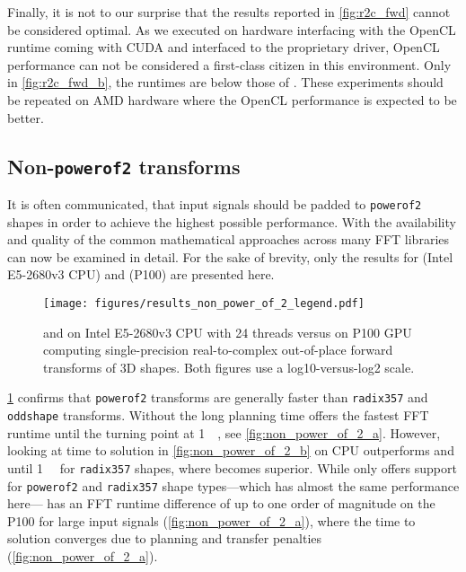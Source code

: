 Finally, it is not to our surprise that the \clfft{} results reported in \cref{fig:r2c_fwd} cannot be considered optimal. As we executed \clfft{} on \nvidia{} hardware interfacing with the OpenCL runtime coming with CUDA and interfaced to the \nvidia{} proprietary driver, OpenCL performance can not be considered a first-class citizen in this environment. Only in \cref{fig:r2c_fwd_b}, the \clfft{} runtimes are below those of \fftw{}. These experiments should be repeated on AMD hardware where the OpenCL performance is expected to be better.
 
\subsection{Non-\texttt{powerof2} transforms}
\label{ssec:nonpowerof2}

It is often communicated, that input signals should be padded to \texttt{powerof2} shapes in order to achieve the highest possible performance. With \gearshifft{} the availability and quality of the common mathematical approaches across many FFT libraries can now be examined in detail. 
For the sake of brevity, only the results for \fftw{} (Intel E5-2680v3 CPU) and \cufft{} (P100) are presented here.

\begin{figure}[!tbp]
  \centering
  \texttt{[image: figures/results\_non\_power\_of\_2\_legend.pdf]}\vspace{-1em}
  \hfill
  \caption{\fftw{} and \clfft{} on Intel E5-2680v3 CPU with 24 threads versus \cufft{} on P100 GPU computing single-precision real-to-complex out-of-place forward transforms of 3D shapes. Both figures use a log10-versus-log2 scale.}
  \label{fig:non_power_of_2}
\end{figure}

\cref{fig:non_power_of_2} confirms that \texttt{powerof2} transforms are generally faster than \texttt{radix357} and \texttt{oddshape} transforms. Without the long planning time \fftw{} offers the fastest FFT runtime until the turning point at \SI{1}{\mebi\byte}, see \cref{fig:non_power_of_2_a}.
However, looking at time to solution in \cref{fig:non_power_of_2_b} \clfft{} on CPU outperforms \fftw{} and \cufft{} until \SI{1}{\mebi\byte} for \texttt{radix357} shapes, where \cufft{} becomes superior.
While \clfft{} only offers support for \texttt{powerof2} and \texttt{radix357} shape types---which has almost the same performance here---\cufft{} has an FFT runtime difference of up to one order of magnitude on the P100 for large input signals (\cref{fig:non_power_of_2_a}), where the time to solution converges due to planning and transfer penalties (\cref{fig:non_power_of_2_a}).

